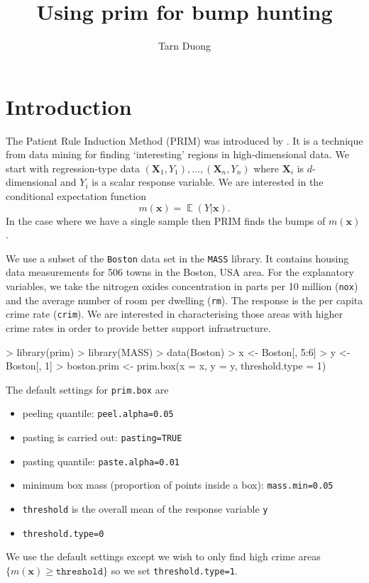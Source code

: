 \documentclass[a4paper,11pt]{article}
\title{Using prim for bump hunting}
\author{Tarn Duong}
\renewcommand{\vec}[1]{\boldsymbol{#1}}
\DeclareMathOperator{\E}{\boldsymbol{\mathbb{E}}}
\def\vecx{\vec{x}}
\def\vecX{\vec{X}}
\begin{document}
\maketitle

\section{Introduction}

The Patient Rule Induction Method (PRIM) was introduced
by \citet*{friedman99}. It is a technique from data mining 
for finding `interesting' regions in high-dimensional data. 
We start with regression-type data $(\vecX_1, Y_1), \dots, (\vecX_n, Y_n)$
where $\vecX_i$ is $d$-dimensional and $Y_i$ is a scalar response variable.
We are interested in the conditional expectation function
$$
m(\vecx) = \E (Y | \vecx).    
$$
In the case where we have a single sample then PRIM
finds the bumps of $m(\vecx)$. 

We use a subset of the \texttt{Boston} 
data set in the \texttt{MASS} library. It contains
housing data measurements for 506 towns in the Boston, USA area.
For the explanatory variables, we
take the nitrogen oxides concentration in parts per 10 million (\texttt{nox}) 
and the average number of room per dwelling (\texttt{rm}). The 
response is the per capita crime rate (\texttt{crim}). 
We are interested in characterising those areas with higher crime rates
in order to provide better support infrastructure.

\begin{Schunk}
\begin{Sinput}
> library(prim)
> library(MASS)
> data(Boston)
> x <- Boston[, 5:6]
> y <- Boston[, 1]
> boston.prim <- prim.box(x = x, y = y, threshold.type = 1)
\end{Sinput}
\end{Schunk}
The default settings for \texttt{prim.box} are
\begin{itemize}
\item peeling quantile: \texttt{peel.alpha=0.05}
\item pasting is carried out: \texttt{pasting=TRUE} 
\item pasting quantile: \texttt{paste.alpha=0.01}
\item minimum box mass (proportion of points inside a box): 
 \texttt{mass.min=0.05} 
\item \texttt{threshold} is the overall mean of the response variable \texttt{y}
\item \texttt{threshold.type=0}
\end{itemize}
We use the default settings except we wish to only find high crime areas 
$\lbrace m(\vecx) \geq \texttt{threshold} \rbrace$
so we set \texttt{threshold.type=1}. 
\end{document}
